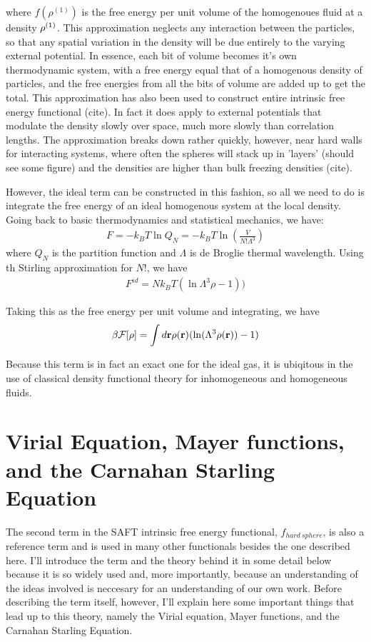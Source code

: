 where $f(\rho^{(1)})$ is the free energy per unit volume of the
homogenoues fluid at a density $\rho^{(1)}$.  This approximation neglects any
interaction between the particles, so that any spatial variation in
the density will be due entirely to the varying external potential.
In essence, each bit of volume becomes it's own thermodynamic system,
with a free energy equal that of a homogenous density of particles,
and the free energies from all the bits of volume are added up to get
the total.  This approximation has also been used to construct entire
intrinsic free energy functional (cite). In fact it does apply to
external potentials that modulate the density slowly over space, much
more slowly than correlation lengths.  The approximation breaks down
rather quickly, however, near hard walls for interacting systems,
where often the spheres will stack up in 'layers' (should see some
figure) and the densities are higher than bulk freezing densities
(cite).

However, the ideal term can be constructed in this fashion, so all we
need to do is integrate the free energy of an ideal homogenous system
at the local density.  Going back to basic thermodynamics and
statistical mechanics, we have:
\begin{align}
  F = -k_BT \ln Q_N = -k_BT \ln (\frac{V}{N!\Lambda^3})
\end{align}
where $Q_N$ is the partition function and $\Lambda$ is de Broglie
thermal wavelength.  Using th Stirling approximation for $N!$, we have
\begin{align}
F^{id} = Nk_BT(\ln \Lambda^3 \rho - 1))
\end{align}

Taking this as the free energy per unit volume and integrating, we
have
\begin{align}
  \beta \mathcal{F}[\rho] = \int d\textbf{r} \rho(\textbf{r})(\ln (\Lambda^3\rho(\textbf{r}))-1)
\end{align}

Because this term is in fact an exact one for the ideal gas, it is
ubiqitous in the use of classical density functional theory for
inhomogeneous and homogeneous fluids.

\clearpage
\newpage

\section{Virial Equation, Mayer functions, and the Carnahan Starling Equation}

The second term in the SAFT intrinsic free energy functional, $f_{hard~sphere}$, is also a
reference term and is used in many other functionals besides the one
described here.  I'll introduce the term and the theory behind it in
some detail below because it is so widely used and, more importantly,
because an understanding of the ideas involved is neccesary for an
understanding of our own work.  Before describing the term itself,
however, I'll explain here some important things that lead up to this
theory, namely the Virial equation, Mayer functions, and the Carnahan
Starling Equation.

